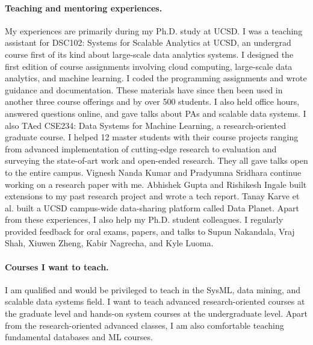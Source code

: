 \documentclass[letterpaper]{article}
\begin{document}
\paragraph{Teaching and mentoring experiences.} My experiences are primarily during my Ph.D. study at UCSD. I was a teaching assistant for DSC102: Systems for Scalable Analytics at UCSD, an undergrad course first of its kind about large-scale data analytics systems. I designed the first edition of course assignments involving cloud computing, large-scale data analytics, and machine learning. I coded the programming assignments and wrote guidance and documentation. These materials have since then been used in another three course offerings and by over 500 students. I also held office hours, answered questions online, and gave talks about PAs and scalable data systems. I also TAed CSE234: Data Systems for Machine Learning, a research-oriented graduate course. I helped 12 master students with their course projects ranging from advanced implementation of cutting-edge research to evaluation and surveying the state-of-art work and open-ended research. They all gave talks open to the entire campus. Vignesh Nanda Kumar and Pradyumna Sridhara continue working on a research paper with me. Abhishek Gupta and Rishikesh Ingale built extensions to my past research project and wrote a tech report. Tanay Karve et al. built a UCSD campus-wide data-sharing platform called Data Planet. Apart from these experiences, I also help my Ph.D. student colleagues. I regularly provided feedback for oral exams, papers, and talks to Supun Nakandala, Vraj Shah, Xiuwen Zheng, Kabir Nagrecha, and Kyle Luoma.

\paragraph{Courses I want to teach.} I am qualified and would be privileged to teach in the SysML, data mining, and scalable data systems field. I want to teach advanced research-oriented courses at the graduate level and hands-on system courses at the undergraduate level. Apart from the research-oriented advanced classes, I am also comfortable teaching fundamental databases and ML courses.


%
%
\end{document}

